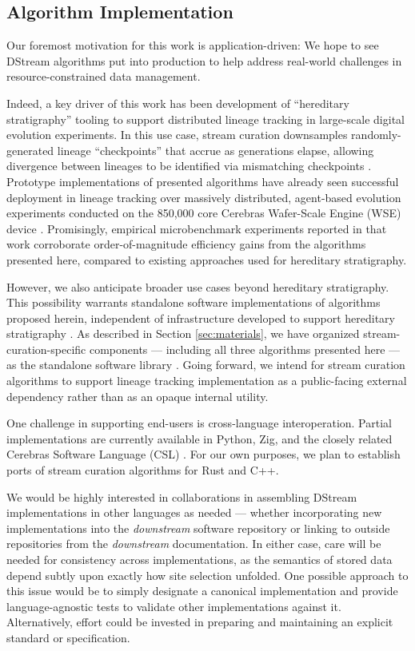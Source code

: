 \subsection{Algorithm Implementation}

Our foremost motivation for this work is application-driven: We hope to see DStream algorithms put into production to help address real-world challenges in resource-constrained data management.

Indeed, a key driver of this work has been development of ``hereditary stratigraphy'' tooling to support distributed lineage tracking in large-scale digital evolution experiments.
In this use case, stream curation downsamples randomly-generated lineage ``checkpoints'' that accrue as generations elapse, allowing divergence between lineages to be identified via mismatching checkpoints \citep{moreno2022hereditary}.
Prototype implementations of presented algorithms have already seen successful deployment in lineage tracking over massively distributed, agent-based evolution experiments conducted on the 850,000 core Cerebras Wafer-Scale Engine (WSE) device \citep{moreno2024trackable}.
Promisingly, empirical microbenchmark experiments reported in that work corroborate order-of-magnitude efficiency gains from the algorithms presented here, compared to existing approaches used for hereditary stratigraphy.

However, we also anticipate broader use cases beyond hereditary stratigraphy.
This possibility warrants standalone software implementations of algorithms proposed herein, independent of infrastructure developed to support hereditary stratigraphy \citep{moreno2022hstrat}.
As described in Section \ref{sec:materials}, we have organized stream-curation-specific components --- including all three algorithms presented here --- as the standalone software library \citep{moreno2024downstream}.
Going forward, we intend for stream curation algorithms to support lineage tracking implementation as a public-facing external dependency rather than as an opaque internal utility.

One challenge in supporting end-users is cross-language interoperation.
Partial implementations are currently available in Python, Zig, and the closely related Cerebras Software Language (CSL) \citep{moreno2024hsurf,moreno2024downstream,moreno2024wse}.
For our own purposes, we plan to establish ports of stream curation algorithms for Rust and C++.

We would be highly interested in collaborations in assembling DStream implementations in other languages as needed --- whether incorporating new implementations into the \textit{downstream} software repository or linking to outside repositories from the \textit{downstream} documentation.
In either case, care will be needed for consistency across implementations, as the semantics of stored data depend subtly upon exactly how site selection unfolded.
One possible approach to this issue would be to simply designate a canonical implementation and provide language-agnostic tests to validate other implementations against it.
Alternatively, effort could be invested in preparing and maintaining an explicit standard or specification.
